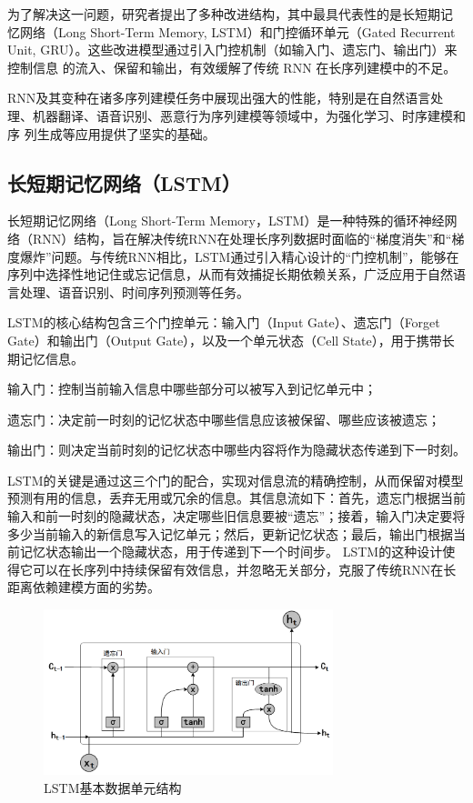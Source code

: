 为了解决这一问题，研究者提出了多种改进结构，其中最具代表性的是长短期记
忆网络（Long Short-Term Memory, LSTM）和门控循环单元（Gated Recurrent Unit, GRU）。这些改进模型通过引入门控机制（如输入门、遗忘门、输出门）来控制信息
的流入、保留和输出，有效缓解了传统 RNN 在长序列建模中的不足。

RNN及其变种在诸多序列建模任务中展现出强大的性能，特别是在自然语言处
理、机器翻译、语音识别、恶意行为序列建模等领域中，为强化学习、时序建模和序
列生成等应用提供了坚实的基础。

\subsection{长短期记忆网络（LSTM）}

长短期记忆网络（Long Short-Term Memory，LSTM）\cite{graves2012long}是一种特殊的循环神经网络（RNN）结构，旨在解决传统RNN在处理长序列数据时面临的“梯度消失”和“梯度爆炸”问题。与传统RNN相比，LSTM通过引入精心设计的“门控机制”，能够在序列中选择性地记住或忘记信息，从而有效捕捉长期依赖关系，广泛应用于自然语言处理、语音识别、时间序列预测等任务。

LSTM的核心结构包含三个门控单元：输入门（Input Gate）、遗忘门（Forget Gate）和输出门（Output Gate），以及一个单元状态（Cell State），用于携带长期记忆信息。

输入门：控制当前输入信息中哪些部分可以被写入到记忆单元中；

遗忘门：决定前一时刻的记忆状态中哪些信息应该被保留、哪些应该被遗忘；

输出门：则决定当前时刻的记忆状态中哪些内容将作为隐藏状态传递到下一时刻。

LSTM的关键是通过这三个门的配合，实现对信息流的精确控制，从而保留对模型预测有用的信息，丢弃无用或冗余的信息。其信息流如下：首先，遗忘门根据当前输入和前一时刻的隐藏状态，决定哪些旧信息要被“遗忘”；接着，输入门决定要将多少当前输入的新信息写入记忆单元；然后，更新记忆状态；最后，输出门根据当前记忆状态输出一个隐藏状态，用于传递到下一个时间步。
LSTM的这种设计使得它可以在长序列中持续保留有效信息，并忽略无关部分，克服了传统RNN在长距离依赖建模方面的劣势。

\begin{figure}[hbt]
	\centering
	\includegraphics[width=0.75\textwidth]{figures/2.5}
	\caption{LSTM基本数据单元结构}\label{fig:2.5}
\end{figure}

